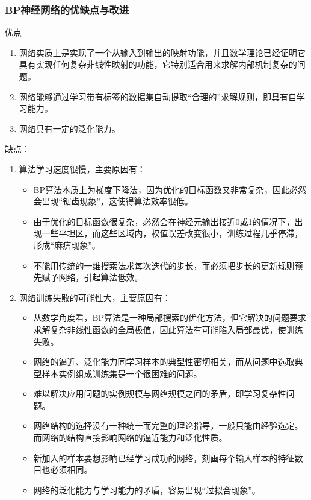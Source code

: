 \documentclass[openany]{progbookcn}
\begin{document}
\subsubsection{BP神经网络的优缺点与改进}
\indent 优点
\begin{enumerate}[itemindent=2em]
    \item 网络实质上是实现了一个从输入到输出的映射功能，并且数学理论已经证明它具有实现任何复杂非线性映射的功能，它特别适合用来求解内部机制复杂的问题。
    \item 网络能够通过学习带有标签的数据集自动提取“合理的”求解规则，即具有自学习能力。
    \item 网络具有一定的泛化能力。
\end{enumerate}
\indent 缺点：
\begin{enumerate}
    \item 算法学习速度很慢，主要原因有：
        \begin{itemize}
            \item BP算法本质上为梯度下降法，因为优化的目标函数又非常复杂，因此必然会出现“锯齿现象”，这使得算法效率很低。
            \item 由于优化的目标函数很复杂，必然会在神经元输出接近0或1的情况下，出现一些平坦区，而这些区域内，权值误差改变很小，训练过程几乎停滞，形成“麻痹现象”。
            \item 不能用传统的一维搜索法求每次迭代的步长，而必须把步长的更新规则预先赋予网络，引起算法低效。
        \end{itemize}
    \item 网络训练失败的可能性大，主要原因有：
        \begin{itemize}
            \item 从数学角度看，BP算法是一种局部搜索的优化方法，但它解决的问题要求求解复杂非线性函数的全局极值，因此算法有可能陷入局部最优，使训练失败。
            \item 网络的逼近、泛化能力同学习样本的典型性密切相关，而从问题中选取典型样本实例组成训练集是一个很困难的问题。
            \item 难以解决应用问题的实例规模与网络规模之间的矛盾，即学习复杂性问题。
            \item 网络结构的选择没有一种统一而完整的理论指导，一般只能由经验选定。而网络的结构直接影响网络的逼近能力和泛化性质。
            \item 新加入的样本要想影响已经学习成功的网络，刻画每个输入样本的特征数目也必须相同。
            \item 网络的泛化能力与学习能力的矛盾，容易出现“过拟合现象”。
        \end{itemize}
\end{enumerate}
 
\end{document}
